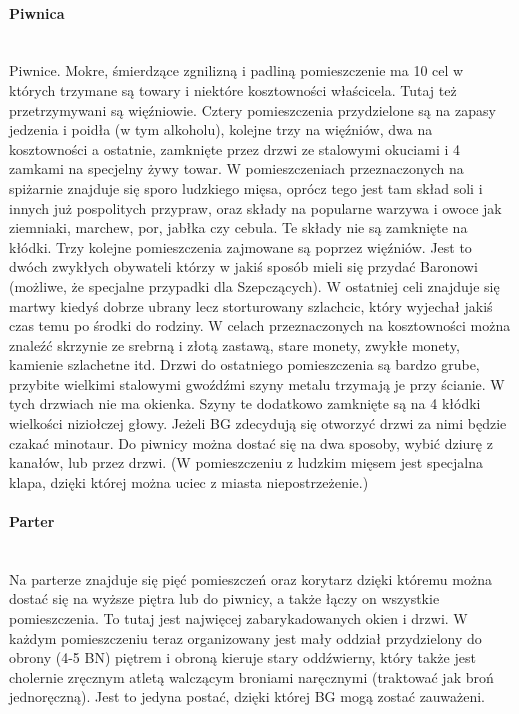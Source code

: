 \documentclass{article}
\begin{document}
\paragraph{\Large{Piwnica}}\mbox{}\\

Piwnice. Mokre, śmierdzące zgnilizną i padliną pomieszczenie ma 10 cel w których trzymane są towary i niektóre kosztowności właścicela. Tutaj też przetrzymywani są więźniowie. Cztery pomieszczenia przydzielone są na zapasy jedzenia i poidła (w tym alkoholu), kolejne trzy na więźniów, dwa na kosztowności a ostatnie, zamknięte przez drzwi ze stalowymi okuciami i 4 zamkami na specjelny żywy towar. W pomieszczeniach przeznaczonych na spiżarnie znajduje się sporo ludzkiego mięsa, oprócz tego jest tam skład soli i innych już pospolitych przypraw, oraz składy na popularne warzywa i owoce jak ziemniaki, marchew, por, jabłka czy cebula. Te składy nie są zamknięte na kłódki. Trzy kolejne pomieszczenia zajmowane są poprzez więźniów. Jest to dwóch zwykłych obywateli którzy w jakiś sposób mieli się przydać Baronowi (możliwe, że specjalne przypadki dla Szepczących). W ostatniej celi znajduje się martwy kiedyś dobrze ubrany lecz storturowany szlachcic, który wyjechał jakiś czas temu po środki do rodziny. W celach przeznaczonych na kosztowności można znaleźć skrzynie ze srebrną i złotą zastawą, stare monety, zwykłe monety, kamienie szlachetne itd. Drzwi do ostatniego pomieszczenia są bardzo grube, przybite wielkimi stalowymi gwoźdźmi szyny metalu trzymają je przy ścianie. W tych drzwiach nie ma okienka. Szyny te dodatkowo zamknięte są na 4 kłódki wielkości niziołczej głowy. Jeżeli BG zdecydują się otworzyć drzwi za nimi będzie czakać minotaur. Do piwnicy można dostać się na dwa sposoby, wybić dziurę z kanałów, lub przez drzwi. (W pomieszczeniu z ludzkim mięsem jest specjalna klapa, dzięki której można uciec z miasta niepostrzeżenie.)

\paragraph{\Large{Parter}}\mbox{}\\

Na parterze znajduje się pięć pomieszczeń oraz korytarz dzięki któremu można dostać się na wyższe piętra lub do piwnicy, a także łączy on wszystkie pomieszczenia. To tutaj jest najwięcej zabarykadowanych okien i drzwi. W każdym pomieszczeniu teraz organizowany jest mały oddział przydzielony do obrony (4-5 BN) piętrem i obroną kieruje stary oddźwierny, który także jest cholernie zręcznym atletą walczącym broniami naręcznymi (traktować jak broń jednoręczną). Jest to jedyna postać, dzięki której BG mogą zostać zauważeni. 
\end{document}
